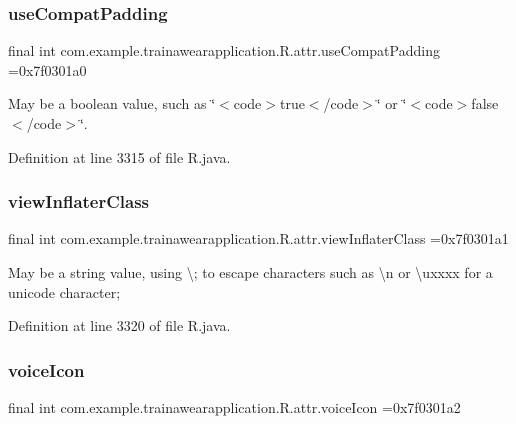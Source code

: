 \subsubsection{\texorpdfstring{useCompatPadding}{useCompatPadding}}
{\footnotesize\ttfamily final int com.\+example.\+trainawearapplication.\+R.\+attr.\+use\+Compat\+Padding =0x7f0301a0\hspace{0.3cm}{\ttfamily [static]}}

May be a boolean value, such as \char`\"{}$<$code$>$true$<$/code$>$\char`\"{} or \char`\"{}$<$code$>$false$<$/code$>$\char`\"{}. 

Definition at line 3315 of file R.\+java.

\mbox{\label{classcom_1_1example_1_1trainawearapplication_1_1_r_1_1attr_ab29a9f9d52b04d35c24d624efe2897ef}} 
\subsubsection{\texorpdfstring{viewInflaterClass}{viewInflaterClass}}
{\footnotesize\ttfamily final int com.\+example.\+trainawearapplication.\+R.\+attr.\+view\+Inflater\+Class =0x7f0301a1\hspace{0.3cm}{\ttfamily [static]}}

May be a string value, using \textquotesingle{}\textbackslash{};\textquotesingle{} to escape characters such as \textquotesingle{}\textbackslash{}n\textquotesingle{} or \textquotesingle{}\textbackslash{}uxxxx\textquotesingle{} for a unicode character; 

Definition at line 3320 of file R.\+java.

\mbox{\label{classcom_1_1example_1_1trainawearapplication_1_1_r_1_1attr_a511371b0397ae0981b2bdd6ec8c36f09}} 
\subsubsection{\texorpdfstring{voiceIcon}{voiceIcon}}
{\footnotesize\ttfamily final int com.\+example.\+trainawearapplication.\+R.\+attr.\+voice\+Icon =0x7f0301a2\hspace{0.3cm}{\ttfamily [static]}}


